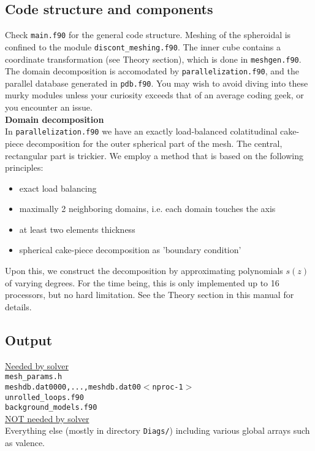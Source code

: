 \documentclass[11pt,letter,fleqn,english,notitlepage]{article}
\begin{document}
\subsection{Code structure and components}
Check {\tt main.f90} for the general code structure. Meshing of the spheroidal is confined to the module 
{\tt discont\_meshing.f90}. The inner cube contains a coordinate transformation (see Theory section), which 
is done in {\tt meshgen.f90}. The domain decomposition is accomodated by {\tt parallelization.f90}, and the 
parallel database generated in {\tt pdb.f90}. You may wish to avoid diving into these murky modules 
unless your curiosity exceeds that of an average coding geek, or you encounter an issue.\\

\noindent\textbf{Domain decomposition }\\
In {\tt parallelization.f90} we have an exactly load-balanced colatitudinal cake-piece decomposition 
for the outer spherical part of the mesh. The central, rectangular part is trickier. 
We employ a method that is based on the following principles:
\begin{itemize}
\item exact load balancing 
\item maximally 2 neighboring domains, i.e. each domain touches the axis
\item at least two elements thickness
\item spherical cake-piece decomposition as 'boundary condition'
\end{itemize}
Upon this, we construct the decomposition by approximating polynomials $s(z)$
of varying degrees. For the time being, this is only implemented up to 
16 processors, but no hard limitation. See the Theory section in this manual for details.

\subsection{Output}
\underline{Needed by solver} \\
{\tt mesh\_params.h}\\
{\tt meshdb.dat0000,...,meshdb.dat00$<$nproc-1$>$}\\
{\tt unrolled\_loops.f90}\\
{\tt background\_models.f90}\\

\noindent\underline{NOT needed by solver }\\
Everything else (mostly in directory {\tt Diags/}) including various global 
arrays such as valence.\\
\end{document}
